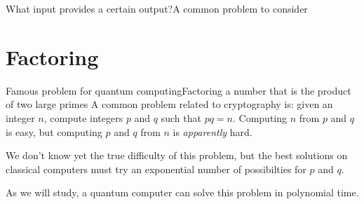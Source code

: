 \begin{frame}{What input provides a certain output?}{A common problem to consider}

\end{frame}

\section{Factoring}

\begin{frame}{Famous problem for quantum computing}{Factoring a number that is the product of two large primes}
A common problem related to cryptography is: given an integer $n$, compute integers $p$ and $q$ such that $pq=n$.  Computing $n$ from $p$ and $q$ is easy, but computing $p$ and $q$ from $n$ is \emph{apparently} hard.

We don't know yet the true difficulty of this problem, but the best solutions on classical computers must try an exponential number of possibilties for $p$ and $q$.

As we will study, a quantum computer can solve this problem in polynomial time.
\end{frame}